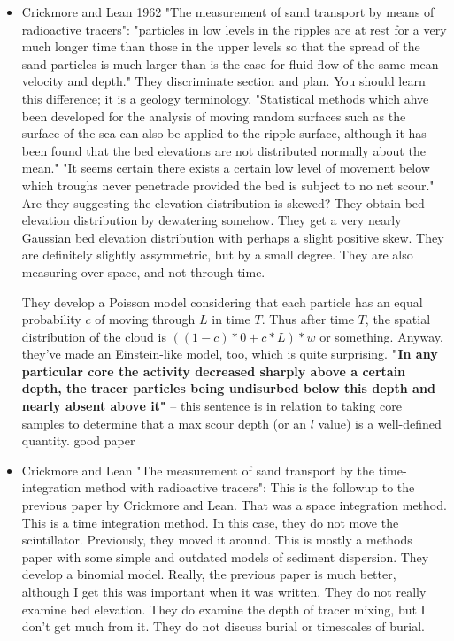 \documentclass{article}
\begin{document}
\begin{itemize}
\item Crickmore and Lean 1962 "The measurement of sand transport by means of radioactive tracers":
"particles in low levels in the ripples are at rest for a very much longer time than those in the upper levels so that the spread of the sand particles is much larger than is the case for fluid flow of the same mean velocity and depth." 
They discriminate section and plan. You should learn this difference; it is a geology terminology. 
"Statistical methods which ahve been developed for the analysis of moving random surfaces such as the surface of the sea can also be applied to the ripple surface, although it has been found that the bed elevations are not distributed normally about the mean." 
"It seems certain there exists a certain low level of movement below which troughs never penetrade provided the bed is subject to no net scour." 
 Are they suggesting the elevation distribution is skewed? 
They obtain bed elevation distribution by dewatering somehow. 
They get a very nearly Gaussian bed elevation distribution with perhaps a slight positive skew. They are definitely slightly assymmetric, but by a small degree. 
They are also measuring over space, and not through time. 

They develop a Poisson model considering that each particle has an equal probability $c$ of moving through $L$ in time $T$. Thus after time $T$, the spatial distribution of the cloud is $((1-c)*0 + c*L)*w$ or something. 
Anyway, they've made an Einstein-like model, too, which is quite surprising. 
\textbf{"In any particular core the activity decreased sharply above a certain depth, the tracer particles being undisurbed below this depth and nearly absent above it"} -- this sentence is in relation to taking core samples to determine that a max scour depth (or an $l$ value) is a well-defined quantity. 
good paper

\item Crickmore and Lean "The measurement of sand transport by the time-integration method with radioactive tracers": 
This is the followup to the previous paper by Crickmore and Lean. 
That was a space integration method. This is a time integration method. 
In this case, they do not move the scintillator. Previously, they moved it around. 
This is mostly a methods paper with some simple and outdated models of sediment dispersion. They develop a binomial model. Really, the previous paper is much better, although I get this was important when it was written. 
They do not really examine bed elevation. They do examine the depth of tracer mixing, but I don't get much from it. 
They do not discuss burial or timescales of burial. 



\end{itemize}
\end{document}
